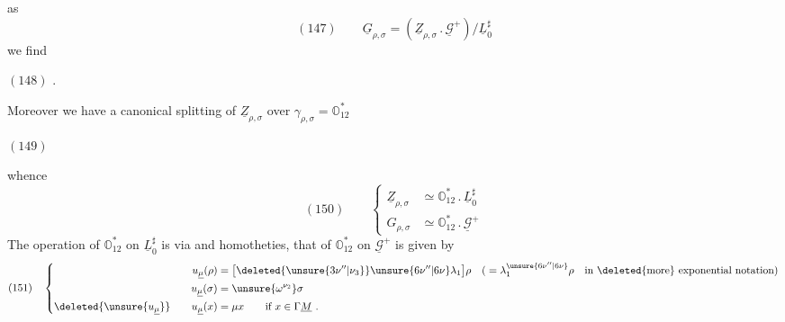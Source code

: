 
as
\[
(147)\qquad\underline G_{\rho,\sigma}
=(\underline Z_{\rho,\sigma}\mathbin{.}\underline{\mathcal G}^{+})/\underline L_0^{\sharp}
\]
we find

\((148)\)
.

Moreover we have a canonical splitting
of \(\underline Z_{\rho,\sigma}\) over \(\gamma_{\rho,\sigma}=\mathbb O_{12}^{*}\)

\((149)\)


whence
\[
(150)\qquad
\left\{\begin{aligned}
\underline Z_{\rho,\sigma}&\simeq\mathbb O_{12}^{*}\mathbin{.}\underline L_0^{\sharp}\\
G_{\rho,\sigma}&\simeq\mathbb O_{12}^{*}\mathbin{.}\underline{\mathcal G}^{+}
\end{aligned}\right.
\]
The operation of \(\mathbb O_{12}^{*}\) on \(\underline L_0^{\sharp}\) is
via
and homotheties, that
of \(\mathbb O_{12}^{*}\) on \(\underline{\mathcal G}^{+}\) is given by
\[
(151)\quad
\left\{\begin{aligned}
u_{\underline\mu}(\rho)&=\bigl[\deleted{\unsure{3\nu''|\nu_3}}\unsure{6\nu''|6\nu}\lambda_1\bigr]\rho
\quad\text{(}=\lambda_1^{\unsure{6\nu''|6\nu}}\rho\quad\text{in \deleted{more} exponential notation}\text{)}\\
u_{\underline\mu}(\sigma)&=\unsure{\omega^{\nu_2}}\sigma\\
\deleted{\unsure{u_{\underline\mu}}}\qquad u_{\underline\mu}(x)&=\mu x\qquad\text{if }x\in\Gamma\underline M\ .
\end{aligned}\right.
\]